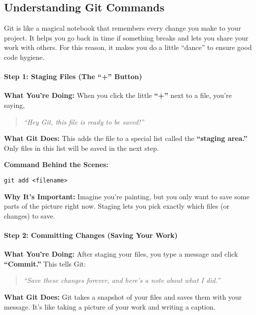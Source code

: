 \documentclass{ximera}
\begin{document}
\begin{multicols}{2}
    \section{Understanding Git Commands}

    Git is like a magical notebook that remembers every change you make to your
    project. It helps you go back in time if something breaks and lets you share
    your work with others. For this reason, it makes you do a little ``dance'' to ensure good code hygiene.

    \paragraph{Step 1: Staging Files (The ``+'' Button)}

    \textbf{What You're Doing:}
    When you click the little \textbf{``+''} next to a file, you're saying,
    \begin{quote}
        \emph{``Hey Git, this file is ready to be saved!''}
    \end{quote}

    \textbf{What Git Does:}
    This adds the file to a special list called the \textbf{``staging area.''} Only
    files in this list will be saved in the next step.

    \textbf{Command Behind the Scenes:}
    \begin{verbatim}
git add <filename>
\end{verbatim}

    \textbf{Why It's Important:}
    Imagine you're painting, but you only want to save some parts of the picture
    right now. Staging lets you pick exactly which files (or changes) to save.

    \paragraph{Step 2: Committing Changes (Saving Your Work)}

    \textbf{What You're Doing:}
    After staging your files, you type a message and click \textbf{``Commit.''}
    This tells Git:
    \begin{quote}
        \emph{``Save these changes forever, and here's a note about what I did.''}
    \end{quote}

    \textbf{What Git Does:}
    Git takes a snapshot of your files and saves them with your message. It's like
    taking a picture of your work and writing a caption.


\end{multicols}
\end{document}
